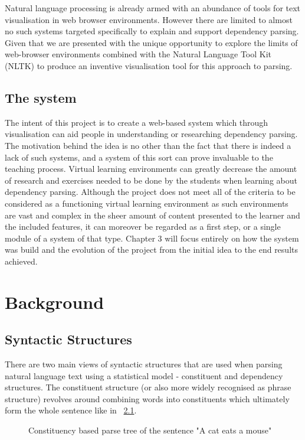 \documentclass[bsc,frontabs,twoside,singlespacing,parskip,deptrepor]{infthesis}
\begin{document}
Natural language processing is already armed with an abundance of tools for text visualisation in web browser environments.\cite{P10} However there are limited to almost no such systems targeted specifically to explain and support dependency parsing. Given that we are presented with the unique opportunity to explore the limits of web-browser environments combined with the Natural Language Tool Kit (NLTK) to produce an inventive visualisation tool for this approach to parsing.

\section{The system}
The intent of this project is to create a web-based system which through visualisation can aid people in understanding or researching dependency parsing. The motivation behind the idea is no other than the fact that there is indeed a lack of such systems, and a system of this sort can prove invaluable to the teaching process. Virtual learning environments can greatly decrease the amount of research and exercises needed to be done by the students when learning about dependency parsing. Although the project does not meet all of the criteria to be considered as a functioning virtual learning environment as such environments are vast and complex in the sheer amount of content presented to the learner and the included features, it can moreover be regarded as a first step, or a single module of a system of that type. Chapter 3 will focus entirely on how the system was build and the evolution of the project from the initial idea to the end results achieved.

\chapter{Background}

\section{Syntactic Structures}
There are two main views of syntactic structures that are used when parsing natural language text using a statistical model - constituent and dependency structures.\cite{P1} The constituent structure (or also more widely recognised as phrase structure) revolves around combining words into constituents which ultimately form the whole sentence like in ~\ref{fig:a_cat}. 

\begin{figure}[H]
\centering
\def\svgwidth{20em}

\caption{Constituency based parse tree of the sentence "A cat eats a mouse" \cite{P11}}
\label{fig:a_cat}
\end{figure}
\end{document}

